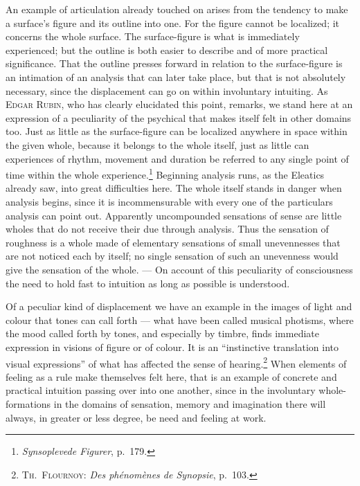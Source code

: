 \documentclass[12pt]{book}
\newcommand{\opage}[1]{\marginnote{\footnotesize\textit{[#1]}}}
\begin{document}
An example of articulation already touched on arises from the tendency to make a
surface's figure and its outline into one. For the figure cannot be localized;
it concerns the whole surface. The surface-figure is what is immediately
experienced; but the outline is both easier to describe and of more practical
significance. That the outline presses forward in relation to the surface-figure
is an intimation of an analysis that can later take place, but that is not
absolutely necessary, since the displacement can go on within involuntary
intuiting. As \textsc{Edgar Rubin}, who has clearly elucidated this point,
remarks, we stand here at an expression of a peculiarity of the psychical that
makes itself felt in other domains too. Just as little as the surface-figure can
be localized anywhere in space within the given whole, because it belongs to the
whole itself, just as little can experiences of rhythm, movement and duration be
referred to any single point of time within the whole
experience.\footnote{\textit{Synsoplevede Figurer}, p.\ 179.} Beginning analysis
runs, as the Eleatics already saw, into great difficulties here. The whole itself
stands in danger when analysis begins, since it is incommensurable with every one
of the particulars analysis can point out. Apparently uncompounded sensations of
sense are little wholes that do not receive their due through analysis. Thus the
sensation of roughness is a whole made of elementary sensations of small
unevennesses that are not noticed each by itself; no single sensation of such an
unevenness would give the sensation of the whole. --- On account of this
peculiarity of consciousness the need to hold fast to intuition as long as
possible is understood.

Of a peculiar kind of displacement we have an example in the images of light and
colour that tones can call forth --- what have been called musical photisms,
where the mood called forth by tones, and especially by timbre, finds immediate
expression in visions of figure or of colour. It is an ``instinctive translation
into visual expressions'' \opage{25}of what has affected the sense of
hearing.\footnote{\textsc{Th.\ Flournoy}: \textit{Des phénomènes de Synopsie},
p.\ 103.} When elements of feeling as a rule make themselves felt here, that is
an example of concrete and practical intuition passing over into one another,
since in the involuntary whole-formations in the domains of sensation, memory
and imagination there will always, in greater or less degree, be need and
feeling at work.
\end{document}
